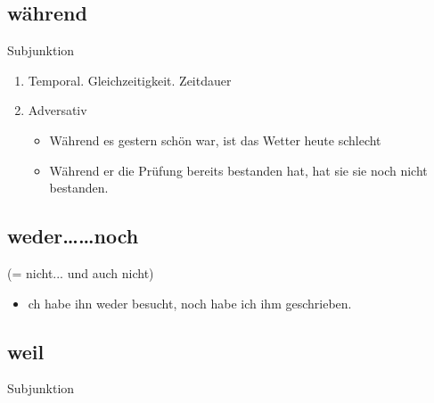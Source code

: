 \documentclass[UTF8]{report}
\begin{document}
\subsection{während}
Subjunktion
\begin{enumerate}
    \item Temporal. Gleichzeitigkeit. Zeitdauer
    \item Adversativ
    \begin{itemize}
        \item Während es gestern schön war, ist das Wetter heute schlecht
        \item Während er die Prüfung bereits bestanden hat, hat sie sie noch nicht bestanden.
    \end{itemize}
\end{enumerate}


\subsection{weder……noch}
(= nicht... und auch nicht)
\begin{itemize}
    \item ch habe ihn weder besucht, noch habe ich ihm geschrieben.
\end{itemize}

\subsection{weil}
Subjunktion
\end{document}

